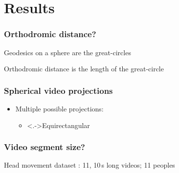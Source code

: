 \section{Results}

\begin{frame}[c]
   \frametitle{Orthodromic distance?}

   Geodesics on a sphere are the great-circles

   Orthodromic distance is the length of the great-circle

   \begin{independentCounter}
      \begin{center}
         
      \end{center}
   \end{independentCounter}

\end{frame}

\begin{frame}[c]
   \frametitle{Spherical video projections}

   \vfill

   \begin{itemize}
      \item<+-> Multiple possible projections:
      \begin{itemize}
         \item \uncover<.->{Equirectangular}
      \end{itemize}
   \end{itemize}

   \vfill

   \begin{independentCounter}
      \begin{center}
         
      \end{center}
   \end{independentCounter}

\end{frame}

\begin{frame}[c]
   \frametitle{Video segment size?}
   Head movement dataset
   : 11, 10\,s long videos; 11 peoples %
   \vspace{-0.4cm}
   \begin{independentCounter}
   \end{independentCounter}
\end{frame}


